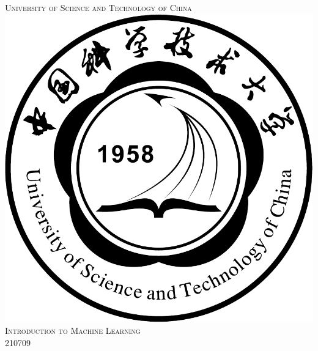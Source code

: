 \documentclass[12pt]{article}
\begin{document}
\begin{titlepage}

\newcommand{\HRule}{\rule{\linewidth}{0.5mm}} %

\center %
 

\textsc{\LARGE University of Science and Technology of China}\\[1.5cm] %
\includegraphics[scale=.3]{ustc_logo_fig.pdf}\\[1cm] %
\textsc{\Large Introduction to Machine Learning}\\[0.5cm] %
\textsc{\large 210709}\\[0.5cm] %



\end{titlepage}
\end{document}
